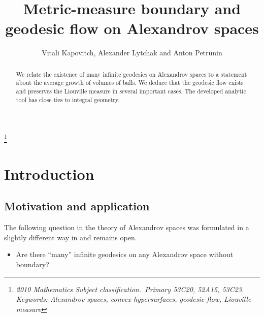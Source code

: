 \documentclass[12pt,leqno,intlimits]{amsart}
\numberwithin{equation}{section}
\theoremstyle{definition}
\theoremstyle{remark}
\begin{document}
\pagebreak
%


\title{Metric-measure boundary and geodesic flow  on Alexandrov spaces}
\thanks{\it 2010 Mathematics Subject classification.\rm\ Primary
53C20, 52A15, 53C23. Keywords: Alexandrov spaces, convex hypersurfaces, geodesic flow, Liouville measure}\

\author{Vitali Kapovitch, Alexander Lytchak and Anton Petrunin}







\begin{abstract}
 We relate the existence of many infinite geodesics on Alexandrov spaces to a statement about the average growth of volumes of balls. We deduce that the geodesic flow exists and preserves the Liouville measure in several important cases. The developed analytic tool has close ties  to integral geometry.
\end{abstract}


\maketitle
\renewcommand{\theequation}{\arabic{section}.\arabic{equation}}


\section{Introduction}
\subsection{Motivation and application}
 The following question in the theory of Alexandrov spaces was formulated in a slightly different way in \cite{PP} and remains open.
\begin{itemize}
\item Are there  ``many'' infinite geodesics on any Alexandrov space without boundary?
\end{itemize}
\end{document}
